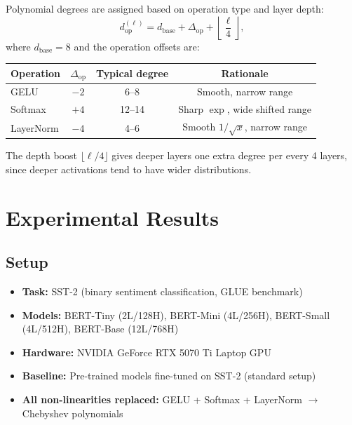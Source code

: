 \documentclass[12pt, a4paper]{article}
\begin{document}
Polynomial degrees are assigned based on operation type and layer depth:
\begin{equation}
  d^{(\ell)}_{\text{op}} = d_{\text{base}} + \Delta_{\text{op}} + \left\lfloor \frac{\ell}{4} \right\rfloor,
  \label{eq:adaptive_degree}
\end{equation}
where $d_{\text{base}} = 8$ and the operation offsets are:
\begin{center}
\renewcommand{\arraystretch}{1.2}
\begin{tabular}{lccc}
\toprule
Operation & $\Delta_{\text{op}}$ & Typical degree & Rationale \\
\midrule
GELU       & $-2$ & 6--8  & Smooth, narrow range \\
Softmax    & $+4$ & 12--14 & Sharp $\exp$, wide shifted range \\
LayerNorm  & $-4$ & 4--6  & Smooth $1/\sqrt{x}$, narrow range \\
\bottomrule
\end{tabular}
\end{center}

The depth boost $\lfloor \ell/4 \rfloor$ gives deeper layers one extra degree per every 4 layers, since deeper activations tend to have wider distributions.

\section{Experimental Results}

\subsection{Setup}

\begin{itemize}[leftmargin=2em]
  \item \textbf{Task:} SST-2 (binary sentiment classification, GLUE benchmark)
  \item \textbf{Models:} BERT-Tiny (2L/128H), BERT-Mini (4L/256H), BERT-Small (4L/512H), BERT-Base (12L/768H)
  \item \textbf{Hardware:} NVIDIA GeForce RTX 5070 Ti Laptop GPU
  \item \textbf{Baseline:} Pre-trained models fine-tuned on SST-2 (standard setup)
  \item \textbf{All non-linearities replaced:} GELU + Softmax + LayerNorm $\to$ Chebyshev polynomials
\end{itemize}
\end{document}
